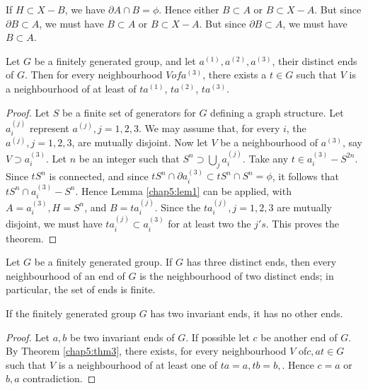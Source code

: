 If $H \subset X - B$, we have $\partial A \cap B = \phi $. Hence
either $B \subset A$ or $B\subset X -A $. But since $\partial B
\subset A$, we must have $B \subset A$ or $B \subset X -A $. But since
$\partial B \subset A$, we must have $B \subset A$.  

\begin{thm} %
  Let  $G$ be a finitely generated group, and let $a^{(1)}, a^{(2)},
  a^{(3)}$, their distinct ends of $G$. Then for every neighbourhood $V
  of a^{(3)}$, there exists a $t \in G$ such that $V$ is a neighbourhood
  of at least of $ta^{(1)}$, $ta^{(2)}$, $ta^{(3)}$.  
\end{thm}

\begin{proof}
  Let $S$ be a finite set of generators for $G$ defining a graph
  structure. Let $a_i^{(j)}$ represent $a^{(j)}, j = 1, 2, 3$. We may
  assume that, for every $i$, the $a^{(j)}, j = 1, 2, 3$, are mutually
  disjoint. Now let $V$ be a neighbourhood of $a^{(3)}$, say
  $V \supset a_i^{(3)}$. Let 
  $n$ be an integer such that $S^n \supset \bigcup\limits_j a_i^{(j)}$. Take any
  $t\in a_i^{(3)}- S^{2n}$. Since $tS^n$ is connected, and since $tS^n
  \cap \partial a_i^{(3)}\subset tS^n \cap S^n = \phi$, it follows that
  $tS^n \cap a_i^{(3)} - S^n$. Hence Lemma \ref{chap5:lem1} can be applied,
  with $A = a^{(3)}_i, H = S^n$, and $B = ta_i ^{(j)}$. Since the $ta_i
  ^{(j)}, j = 1, 2, 3$ are mutually disjoint, we must have $ta_i ^{(j)}
  \subset a_i ^{(3)}$ for at least two the $j's $. This proves the
  theorem.  
\end{proof}

\begin{corollary}%
  Let $G$ be a finitely generated group. If $G$ has three distinct ends,
  then every neighbourhood of an end of $G$ is the neighbourhood of two
  distinct ends; in particular, the set of ends is finite. 
\end{corollary}

\begin{corollary}%
  If the finitely generated group $G$ has two invariant ends, it has
  no other ends.  
\end{corollary}

\begin{proof}
  Let $a, b$ be two invariant ends of $G$. If possible let $c$ be
  another end of $G$. By Theorem \ref{chap5:thm3}, there exists, for every
  neighbourhood $V$ of\pageoriginale $ c, a t \in G$ such that $V$ is
  a neighbourhood of at least one of $ ta = a,  tb = b, $. Hence $c
  = a$ or $ b, a$ contradiction.  
\end{proof}

